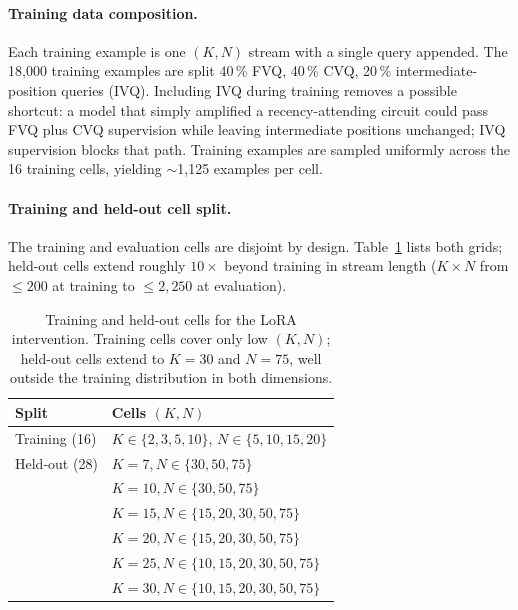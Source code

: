 \documentclass[11pt]{article}
\begin{document}
\paragraph{Training data composition.}
Each training example is one $(K, N)$ stream with a single query
appended.
The 18{,}000 training examples are split 40\,\% FVQ, 40\,\% CVQ,
20\,\% intermediate-position queries (IVQ).
Including IVQ during training removes a possible shortcut: a model
that simply amplified a recency-attending circuit could pass FVQ
plus CVQ supervision while leaving intermediate positions unchanged;
IVQ supervision blocks that path.
Training examples are sampled uniformly across the 16 training
cells, yielding $\sim$1{,}125 examples per cell.

\paragraph{Training and held-out cell split.}
The training and evaluation cells are disjoint by design.
Table~\ref{tab:lora_cells} lists both grids; held-out cells extend
roughly $10\times$ beyond training in stream length ($K \times N$
from $\le 200$ at training to $\le 2{,}250$ at evaluation).

\begin{table}[!htbp]
\centering
\footnotesize
\setlength{\tabcolsep}{4pt}
\begin{tabular}{ll}
\toprule
\textbf{Split} & \textbf{Cells $(K, N)$} \\
\midrule
Training (16) & $K \in \{2, 3, 5, 10\}$, $N \in \{5, 10, 15, 20\}$ \\
\midrule
Held-out (28) & $K{=}7, N \in \{30, 50, 75\}$ \\
              & $K{=}10, N \in \{30, 50, 75\}$ \\
              & $K{=}15, N \in \{15, 20, 30, 50, 75\}$ \\
              & $K{=}20, N \in \{15, 20, 30, 50, 75\}$ \\
              & $K{=}25, N \in \{10, 15, 20, 30, 50, 75\}$ \\
              & $K{=}30, N \in \{10, 15, 20, 30, 50, 75\}$ \\
\bottomrule
\end{tabular}
\caption{Training and held-out cells for the LoRA intervention.
Training cells cover only low $(K, N)$; held-out cells extend to
$K{=}30$ and $N{=}75$, well outside the training distribution in
both dimensions.}
\label{tab:lora_cells}
\end{table}
\end{document}
